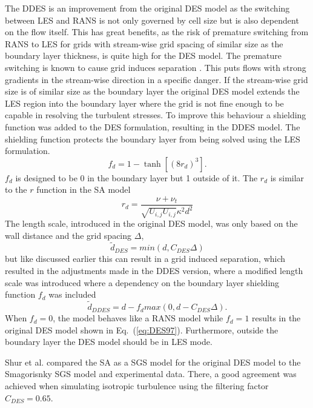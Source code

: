 The DDES is an improvement from the original DES model as the switching between LES and RANS is not only governed by cell size but is also dependent on the flow itself. This has great benefits, as the risk of premature switching from RANS to LES for grids with stream-wise grid spacing of similar size as the boundary layer thickness, is quite high for the DES model. The premature switching is known to cause grid induces separation \cite{DDES}. This puts flows with strong gradients in the stream-wise direction in a specific danger. If the stream-wise grid size is of similar size as the boundary layer the original DES model extends the LES region into the boundary layer where the grid is not fine enough to be capable in resolving the turbulent stresses. To improve this behaviour a shielding function was added to the DES formulation, resulting in the DDES model. The shielding function protects the boundary layer from being solved using the LES formulation.
\begin{equation}
  f_d = 1-\tanh\left[(8r_d)^3\right].
  \label{eq:fd}
\end{equation}
$f_d$ is designed to be 0 in the boundary layer but 1 outside of it. The $r_d$ is similar to the $r$ function in the SA model
\begin{equation}
  r_d = \frac{\nu+\nu_t}{\sqrt{U_{i,j}U_{i,j}}\kappa^2 d^2}
  \label{eq:rd}
\end{equation}
The length scale, introduced in the original DES model, was only based on the wall distance and the grid spacing $\Delta$,
\begin{equation}
  \tilde{d}_{DES}=min(d,C_{DES}\Delta)
  \label{eq:DES97}
\end{equation}
but like discussed earlier this can result in a grid induced separation, which resulted in the adjustments made in the DDES version, where a modified length scale was introduced where a dependency on the boundary layer shielding function $f_d$ was included
\begin{equation}
  \tilde{d}_{DDES} = d-f_dmax(0,d-C_{DES}\Delta).
  \label{eq:DDES}
\end{equation}
When $f_d=0$, the model behaves like a RANS model while $f_d=1$ results in the original DES model shown in Eq.~(\ref{eq:DES97}). Furthermore, outside the boundary layer the DES model should be in LES mode. 

Shur et al. \cite{DES99} compared the SA as a SGS model for the original DES model to the Smagorisnky SGS model and experimental data. There, a good agreement was achieved when simulating isotropic turbulence using the filtering factor $C_{DES}=0.65$.

